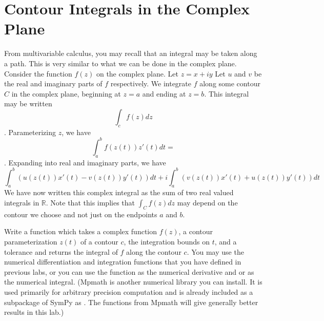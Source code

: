 

\section*{Contour Integrals in the Complex Plane}

From multivariable calculus, you may recall that an integral may be taken along a path.
This is very similar to what we can be done in the complex plane.
Consider the function $f(z)$ on the complex plane.
Let $z=x+iy$ Let $u$ and $v$ be the real and imaginary parts of $f$ respectively.
We integrate $f$ along some contour $C$ in the complex plane, beginning at $z=a$ and ending at $z=b$.
This integral may be written $$\int_c f(z)dz$$.
Parameterizing $z$, we have $$\int_a^b f(z(t))z'(t)dt=$$.
Expanding into real and imaginary parts, we have
$$\int_a^b (u(z(t))x'(t)-v(z(t))y'(t))dt +i \int_a^b(v(z(t))x'(t)+u(z(t))y'(t))dt$$
We have now written this complex integral as the sum of two real valued integrals in $\mathbb{R}$.
Note that this implies that $\int_C f(z) dz$ may depend on the contour we choose and not just on the endpoints $a$ and $b$.

\begin{problem}
Write a function which takes a complex function $f(z)$, a contour parameterization $z(t)$ of a contour $c$, the integration bounds on $t$, and a tolerance and returns the integral of $f$ along the contour $c$. 
You may use the numerical differentiation and integration functions that you have defined in previous labs, or you can use the function  as the numerical derivative and  or  as the numerical integral.
(Mpmath is another numerical library you can install.
It is used primarily for arbitrary precision computation and is already included as a subpackage of SymPy as . The functions from Mpmath will give generally better results in this lab.)
\end {problem}

